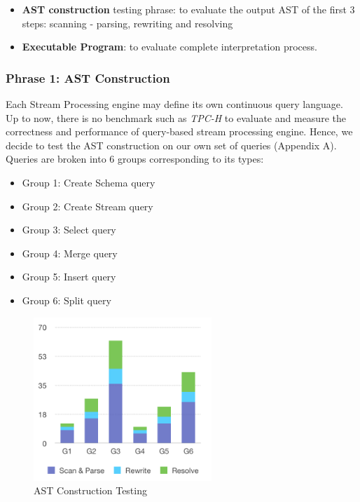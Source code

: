 \begin{itemize}
	\item \textbf{AST construction} testing phrase: to evaluate the output AST of the first 3 steps: scanning -  parsing, rewriting and resolving
	\item \textbf{Executable Program}: to evaluate complete interpretation process.
\end{itemize}

\subsubsection{Phrase 1: AST Construction}
Each Stream Processing engine may define its own continuous query language. Up to now, there is no benchmark such as \textit{TPC-H} to evaluate and measure the correctness and performance of query-based stream processing engine. 
Hence, we decide to test the AST construction on our own set of queries (Appendix A). Queries are broken into 6 groups corresponding to its types: 
\begin{itemize}
	\item Group 1: Create Schema query
	\item Group 2: Create Stream query
	\item Group 3: Select query
	\item Group 4: Merge query
	\item Group 5: Insert query
	\item Group 6: Split query
\end{itemize} 

\begin{figure}[h!] 
\centering    
\includegraphics[width=0.6\textwidth]{ASTConstruction}
\caption{AST Construction Testing}
\label{fig:ASTConstruction}
\end{figure}

